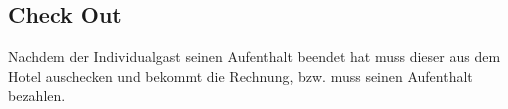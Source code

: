 \documentclass[../SubfileFeatures.tex]{subfiles}
\begin{document}
    \subsection{Check Out}
    Nachdem der Individualgast seinen Aufenthalt beendet hat muss dieser aus dem Hotel auschecken und bekommt die Rechnung,
    bzw. muss seinen Aufenthalt bezahlen.
\end{document}
